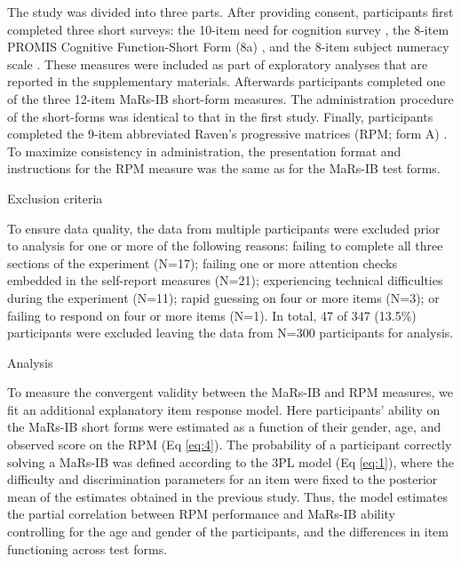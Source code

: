 \documentclass[a4paper,man,natbib]{apa6}
\makeatletter
\renewcommand{\subsubsection}{\@startsection{subsubsection}{3}
  {\z@}%
  {\b@level@two@skip}{\e@level@two@skip}%
  {\normalfont\normalsize\bfseries}}
\makeatother
\begin{document}
The study was divided into three parts. After providing consent, participants first completed three short surveys: the 10-item need for cognition survey \citep{chiesi2018applying}, the 8-item PROMIS Cognitive Function-Short Form (8a) \citep{iverson2021normative}, and the 8-item subject numeracy scale \citep{fagerlin2007measuring}. These measures were included as part of exploratory analyses that are reported in the supplementary materials. Afterwards participants completed one of the three 12-item MaRs-IB short-form measures. The administration procedure of the short-forms was identical to that in the first study. Finally, participants completed the 9-item abbreviated Raven's progressive matrices (RPM; form A) \citep{bilker2012development}. To maximize consistency in administration, the presentation format and instructions for the RPM measure was the same as for the MaRs-IB test forms.

\subsubsection{Exclusion criteria}

To ensure data quality, the data from multiple participants were excluded prior to analysis for one or more of the following reasons: failing to complete all three sections of the experiment (N=17); failing one or more attention checks \citep{zorowitz2021inattentive} embedded in the self-report measures (N=21); experiencing technical difficulties during the experiment (N=11); rapid guessing on four or more items (N=3); or failing to respond on four or more items (N=1). In total, 47 of 347 (13.5\%) participants were excluded leaving the data from N=300 participants for analysis.

\subsubsection{Analysis}

To measure the convergent validity between the MaRs-IB and RPM measures, we fit an additional explanatory item response model. Here participants' ability on the MaRs-IB short forms were estimated as a function of their gender, age, and observed score on the RPM (Eq \ref{eq:4}). The probability of a participant correctly solving a MaRs-IB was defined according to the 3PL model (Eq \ref{eq:1}), where the difficulty and discrimination parameters for an item were fixed to the posterior mean of the estimates obtained in the previous study. Thus, the model estimates the partial correlation between RPM performance and MaRs-IB ability controlling for the age and gender of the participants, and the differences in item functioning across test forms.
\end{document}
